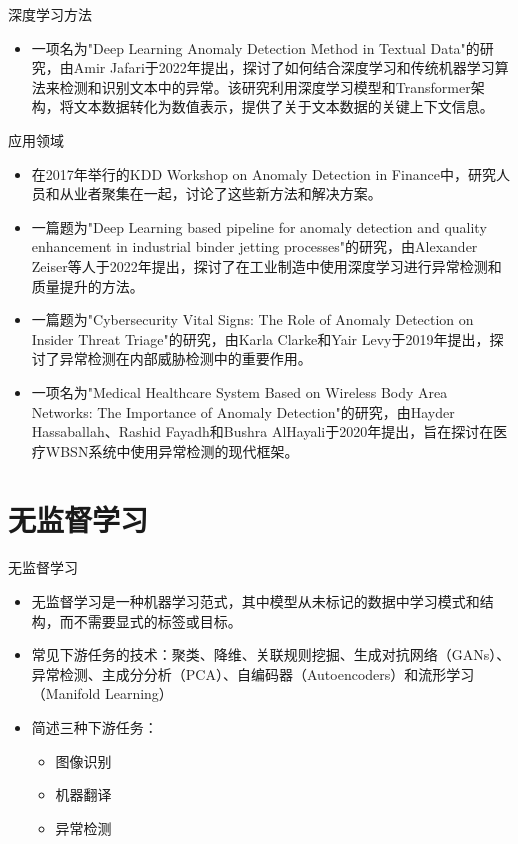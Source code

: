 \documentclass[UTF8]{beamer}
\begin{document}
\begin{frame}{深度学习方法}
    \begin{itemize}
        \item 一项名为"Deep Learning Anomaly Detection Method in Textual Data"的研究，由Amir Jafari于2022年提出，探讨了如何结合深度学习和传统机器学习算法来检测和识别文本中的异常。该研究利用深度学习模型和Transformer架构，将文本数据转化为数值表示，提供了关于文本数据的关键上下文信息。
    \end{itemize}
\end{frame}

\begin{frame}{应用领域}
    \scriptsize
    \begin{itemize}
        \item 在2017年举行的KDD Workshop on Anomaly Detection in Finance中，研究人员和从业者聚集在一起，讨论了这些新方法和解决方案。
        \item 一篇题为"Deep Learning based pipeline for anomaly detection and quality enhancement in industrial binder jetting processes"的研究，由Alexander Zeiser等人于2022年提出，探讨了在工业制造中使用深度学习进行异常检测和质量提升的方法。
        \item 一篇题为"Cybersecurity Vital Signs: The Role of Anomaly Detection on Insider Threat Triage"的研究，由Karla Clarke和Yair Levy于2019年提出，探讨了异常检测在内部威胁检测中的重要作用。
        \item 一项名为"Medical Healthcare System Based on Wireless Body Area Networks: The Importance of Anomaly Detection"的研究，由Hayder Hassaballah、Rashid Fayadh和Bushra AlHayali于2020年提出，旨在探讨在医疗WBSN系统中使用异常检测的现代框架。
    \end{itemize}
\end{frame}


\section{无监督学习}

\begin{frame}{无监督学习}
    \begin{itemize}
        \item 无监督学习是一种机器学习范式，其中模型从未标记的数据中学习模式和结构，而不需要显式的标签或目标。
        \item 常见下游任务的技术：聚类、降维、关联规则挖掘、生成对抗网络（GANs）、异常检测、主成分分析（PCA）、自编码器（Autoencoders）和流形学习（Manifold Learning）
        \item 简述三种下游任务：
        \begin{itemize}
            \item 图像识别
            \item 机器翻译
            \item 异常检测
        \end{itemize}
    \end{itemize}
\end{frame}
\end{document}
